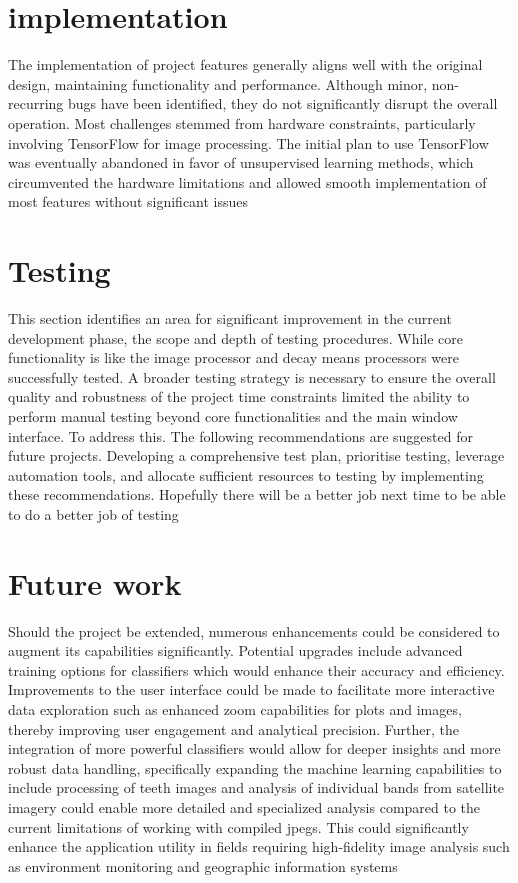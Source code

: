 \section{implementation}\label{sec:implementation}

The implementation of project features generally aligns well with the original design, maintaining functionality and performance.
Although minor, non-recurring bugs have been identified, they do not significantly disrupt the overall operation.
Most challenges stemmed from hardware constraints, particularly involving TensorFlow for image processing.
The initial plan to use TensorFlow was eventually abandoned in favor of unsupervised learning methods,
which circumvented the hardware limitations and allowed smooth implementation of most features without significant issues


\section{Testing}\label{sec:testing}

This section identifies an area for significant improvement in the current development phase, the scope and depth of testing procedures.
While core functionality is like the image processor and decay means processors were successfully tested.
A broader testing strategy is necessary to ensure the overall quality and robustness of the project time constraints limited the ability to perform manual testing beyond core functionalities and the main window interface.
To address this.
The following recommendations are suggested for future projects.
Developing a comprehensive test plan, prioritise testing, leverage automation tools, and allocate sufficient resources to testing by implementing these recommendations.
Hopefully there will be a better job next time to be able to do a better job of testing


\section{Future work}\label{sec:future-work}

Should the project be extended, numerous enhancements could be considered to augment its capabilities significantly.
Potential upgrades include advanced training options for classifiers which would enhance their accuracy and efficiency.
Improvements to the user interface could be made to facilitate more interactive data exploration such as enhanced zoom capabilities for plots and images, thereby improving user engagement and analytical precision.
Further, the integration of more powerful classifiers would allow for deeper insights and more robust data handling\cite{k-textFabian2022}, specifically expanding the machine learning capabilities to include processing of teeth images and analysis of individual bands
from satellite imagery could enable more detailed and specialized analysis compared to the current limitations of working with compiled jpegs.
This could significantly enhance the application utility in fields requiring high-fidelity image analysis such as environment monitoring and geographic information systems


